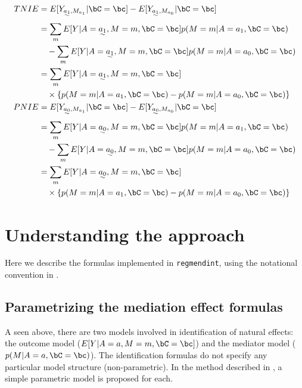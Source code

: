 \documentclass[dvipdfmx,10pt]{article}
\begin{document}
\begin{align*}
  TNIE
  &= E[Y_{\uwave{a_{1}},M_{a_{1}}} | \bC = \bc] - E[Y_{\uwave{a_{1}},M_{a_{0}}} | \bC = \bc]\\
  &=     \sum_{m} E[Y | A = \uwave{a_{1}}, M = m, \bC = \bc] p(M = m | A = a_{1}, \bC = \bc)\\
  &~~~ - \sum_{m} E[Y | A = \uwave{a_{1}}, M = m, \bC = \bc] p(M = m | A = a_{0}, \bC = \bc)\\
  &= \sum_{m} E[Y | A = \uwave{a_{1}}, M = m, \bC = \bc]\\
  &~~~ \times \left\{ p(M = m | A = a_{1}, \bC = \bc) - p(M = m | A = a_{0}, \bC = \bc) \right\}
  \\
  PNIE
   &= E[Y_{\uwave{a_{0}},M_{a_{1}}} | \bC = \bc] - E[Y_{\uwave{a_{0}},M_{a_{0}}} | \bC = \bc]\\
  &=     \sum_{m} E[Y | A = \uwave{a_{0}}, M = m, \bC = \bc] p(M = m | A = a_{1}, \bC = \bc)\\
  &~~~ - \sum_{m} E[Y | A = \uwave{a_{0}}, M = m, \bC = \bc] p(M = m | A = a_{0}, \bC = \bc)\\
  &= \sum_{m} E[Y | A = \uwave{a_{0}}, M = m, \bC = \bc]\\
  &~~~ \times \left\{ p(M = m | A = a_{1}, \bC = \bc) - p(M = m | A = a_{0}, \bC = \bc) \right\}
\end{align*}


\section{Understanding the approach}
\label{sec:orgaf49a24}
Here we describe the formulas implemented in \texttt{regmendint}, using the notational convention in \cite{vanderweeleExplanationCausalInference2015,valeriMediationAnalysisAllowing2013,valeriSASMacroCausal2015}.

\subsection{Parametrizing the mediation effect formulas}
\label{sec:org9141232}
A seen above, there are two models involved in identification of natural effects: the outcome model (\(E[Y|A=a,M=m,\bC=\bc]\)) and the mediator model (\(p(M|A=a,\bC=\bc)\)). The identification formulas do not specify any particular model structure (non-parametric). In the method described in \cite{valeriMediationAnalysisAllowing2013,valeriSASMacroCausal2015}, a simple parametric model is proposed for each.\\
\end{document}

